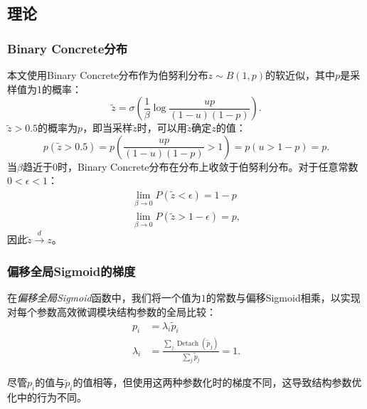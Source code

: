 \subsection{理论}
\subsubsection{Binary Concrete分布}
\label{app:theory:BCD}
本文使用Binary Concrete分布作为伯努利分布$z\sim B(1,p)$的软近似，其中$p$是采样值为1的概率：
\begin{equation}
    \tilde{z} = \sigma\left(\frac1\beta \operatorname{log}\frac{up}{(1-u)(1-p)}\right).
\end{equation}
$\tilde{z}>0.5$的概率为$p$，即当采样$\tilde{z}$时，可以用$\tilde{z}$确定$z$的值：
\begin{equation}
    p(\tilde{z}>0.5) = p\left(\frac{up}{(1-u)(1-p)}>1\right) = p(u>1-p) = p.
\end{equation}
当$\beta$趋近于$0$时，Binary Concrete分布在分布上收敛于伯努利分布。对于任意常数$0<\epsilon<1$：
\begin{align}
    \operatorname{lim}_{\beta\rightarrow 0} P(\tilde{z}<\epsilon) = 1-p \\
    \operatorname{lim}_{\beta\rightarrow 0} P(\tilde{z}>1-\epsilon) = p,
\end{align}
因此$\tilde{z} \xrightarrow{d} z$。


\subsubsection{偏移全局Sigmoid的梯度}
\label{app:Gradient}
在\emph{偏移全局Sigmoid}函数中，我们将一个值为$1$的常数与偏移Sigmoid相乘，以实现对每个参数高效微调模块结构参数的全局比较：
\begin{align}
    {p_i} & = \lambda_i \tilde{p}_i \\
    \lambda_i & = \frac{\sum_j \operatorname{Detach}( \tilde{p}_j)}{\sum_j  \tilde{p}_j}=1.
\end{align}

尽管$p_i$的值与$\tilde{p}_i$的值相等，但使用这两种参数化时的梯度不同，这导致结构参数优化中的行为不同。

